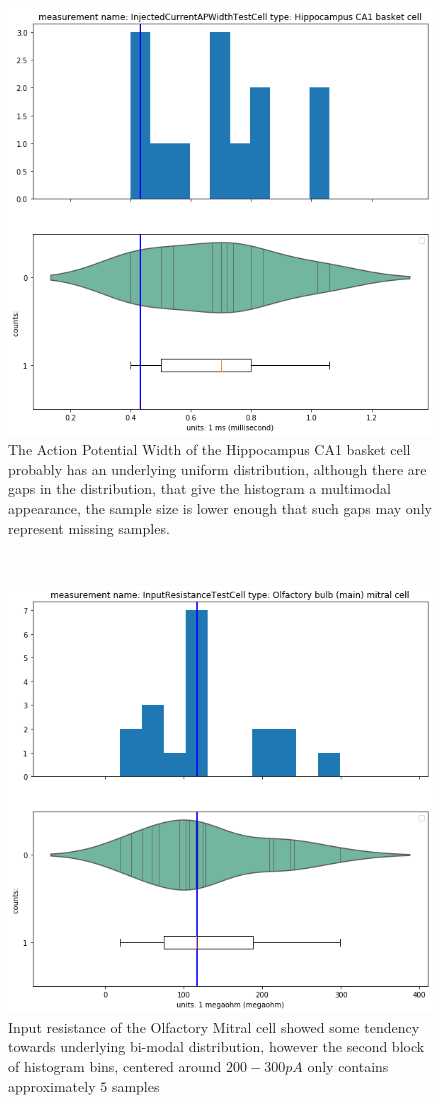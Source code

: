     \begin{center}
   \begin{figure} \includegraphics[width=0.7\linewidth]{notebooks_converted/needata_thesis_files/needata_thesis_5_9}
   \caption{The Action Potential Width of the Hippocampus CA1 basket cell probably has an underlying uniform distribution, although there are gaps in the distribution, that give the histogram a multimodal appearance, the sample size is lower enough that such gaps may only represent missing samples.}
\end{figure}
\end{center}
    { \hspace*{\fill} \\}

\begin{center}
   \begin{figure}   
   \includegraphics[width=0.7\linewidth]{notebooks_converted/needata_thesis_files/needata_thesis_5_21}
         \caption{Input resistance of the Olfactory Mitral cell showed some tendency towards underlying bi-modal distribution, however the second block of histogram bins, centered around $200-300pA$ only contains approximately $5$ samples}
   \end{figure}
\end{center}
   
